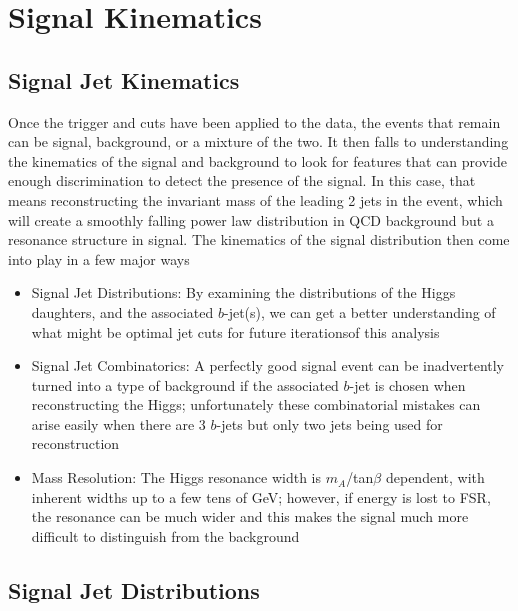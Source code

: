  

\chapter[Signal Kinematics]{Signal Kinematics}

 
\section{Signal Jet Kinematics}

Once the trigger and cuts have been applied to the data, the events that remain can be signal, background, or a mixture of the two.  
It then falls to understanding the kinematics of the signal and background to look for features that can
provide enough discrimination to detect the presence of the signal.  In this case, that means reconstructing
the invariant mass of the leading 2 jets in the event, which will create a smoothly falling power
law distribution in QCD background but a resonance structure in signal.  The kinematics of the signal
distribution then come into play in a few major ways
\begin{itemize}
    \item Signal Jet \pt Distributions:  By examining the \pt distributions of the Higgs daughters, and the associated $b$-jet(s), we can get a better understanding of what might be optimal jet \pt cuts for future iterationsof this analysis 
    \item Signal Jet Combinatorics: A perfectly good signal event can be inadvertently turned into a type of background if the associated $b$-jet is chosen when reconstructing the Higgs; unfortunately these combinatorial mistakes can arise easily when there are 3 $b$-jets but only two jets being used for reconstruction
    \item Mass Resolution: The Higgs resonance width is $m_A$/tan$\beta$ dependent, with inherent widths
up to a few tens of GeV; however, if energy is lost to FSR, the resonance can be much wider and this makes
the signal much more difficult to distinguish from the background
\end{itemize}


\section{Signal Jet \pt Distributions}

